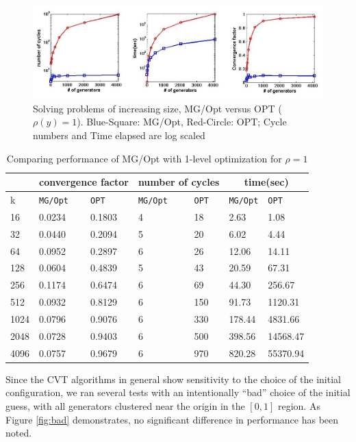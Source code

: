 \documentclass{siamltex}
\begin{document}
\begin{figure}[h]
\centering
  \includegraphics[width=1.0\textwidth]{ave_uni_mg_opt1.jpg}
  \caption{Solving problems of increasing size, MG/Opt versus OPT ($\rho(y) = 1$).  Blue-Square: MG/Opt, Red-Circle: OPT; Cycle numbers and Time elapsed are log scaled}
\label{fig:g_uni}
\end{figure}


\begin{table}
\begin{center}
\begin{tabular}{|l||l|l||l|l||l|l|} \hline
 &\multicolumn{2}{|c|}{convergence factor} &\multicolumn{2}{|c|}{number of cycles} &\multicolumn{2}{|c|}{time(sec)}\\ \hline
k& {\tt MG/Opt}&{\tt OPT}&{\tt MG/Opt}&{\tt OPT}&{\tt MG/Opt}&{\tt OPT}\\ \hline
16&0.0234&0.1803&4&18&2.63&1.08\\ \hline
32&0.0440&0.2094&5&20&6.02&4.44 \\ \hline
64&0.0952&0.2897&6&26&12.06&14.11 \\ \hline
128&0.0604&0.4839&5&43 &20.59&67.31\\ \hline
256&0.1174&0.6474&6&69&44.30&256.67 \\ \hline
512&0.0932&0.8129&6&150&91.73&1120.31 \\ \hline
1024&0.0796&0.9076&6&330&178.44&4831.66 \\ \hline
2048&0.0728&0.9403&6&500&398.56&14568.47 \\ \hline
4096&0.0757&0.9679&6&970&820.28&55370.94\\ \hline
 \end{tabular}
\end{center}
\caption{Comparing performance of MG/Opt with 1-level optimization for $\rho=1$ }
\label{unitable}
\end{table}

Since the CVT algorithms in general show sensitivity 
to the choice of the initial configuration, we ran several tests with an intentionally ``bad'' %
choice of the initial guess, with all generators clustered near the origin in the $[0,1]$ region. As Figure \ref{fig:bad} demonstrates, no significant difference in performance has been noted.
\end{document}
